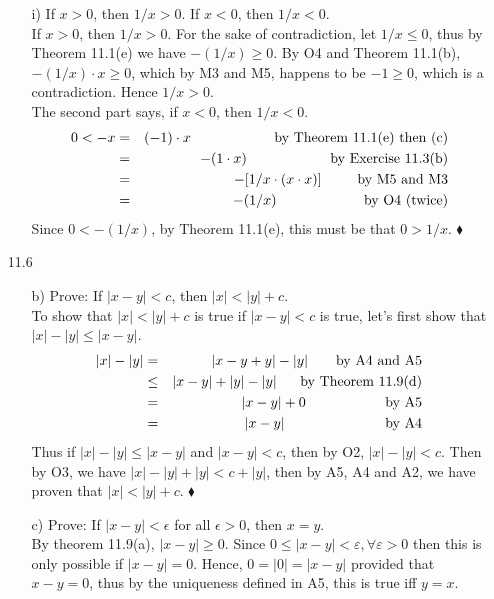 \documentclass[12pt]{article}
\begin{document}
\begin{enumerate}
\begin{enumerate}
\item[i)] If $x > 0$, then $1/x > 0$. If $x < 0$, then $1/x < 0$. \\
If $x > 0$, then $1/x > 0$. For the sake of contradiction, let $1/x \leq 0$, thus by Theorem 11.1(e) we have $-(1/x) \geq 0$. By O4 and Theorem 11.1(b), $-(1/x) \cdot x \geq 0$, which by M3 and M5, happens to be $-1 \geq 0$, which is a contradiction. Hence $1/x > 0$. \[ \]
The second part says, if $x < 0$, then $1/x < 0$. 
\begin{eqnarray*}
0 < -x &=& (-1) \cdot x \hskip 2.1cm \mbox{by Theorem 11.1(e) then (c)} \\
&=& -(1 \cdot x) \hskip 2.1cm \mbox{by Exercise 11.3(b)} \\
&=& -[1/x \cdot (x \cdot x)] \hskip .9cm \mbox{by M5 and M3} \\
&=& -(1/x) \hskip 2.2cm \mbox{by O4 (twice)}
\end{eqnarray*}
Since $0 < -(1/x)$, by Theorem 11.1(e), this must be that $0 > 1/x$. $\blacklozenge$
\end{enumerate}

\item[11.6] 
\begin{enumerate}
\item[b)] Prove: If $|x - y| < c$, then $|x| < |y| + c$. \\
To show that $|x| < |y| + c$ is true if $|x - y| < c$ is true, let's first show that
$|x| - |y| \leq |x - y|$. 
\begin{eqnarray*}
|x| - |y| &=& |x - y + y| - |y| \qquad \mbox{by A4 and A5} \\
&\leq& |x - y| + |y| - |y| \hskip 0.59cm \mbox{by Theorem 11.9(d)} \\
&=& |x - y| + 0 \hskip 2.00cm \mbox{by A5} \\
&=& |x - y| \hskip 2.53cm \mbox{by A4} 
\end{eqnarray*}
Thus if $|x| - |y| \leq |x - y|$ and $|x - y| < c$, then by O2, $|x| - |y| < c$. Then by O3, 
we have $|x| - |y| + |y| < c + |y|$, then by A5, A4 and A2, we have proven that $|x| < |y| + c$.
$\blacklozenge$

\item[c)] Prove: If $|x - y| < \epsilon$ for all $\epsilon > 0$, then $x = y$. \\
By theorem 11.9(a), $|x - y| \geq 0$. Since $0 \leq |x - y| < \varepsilon, \forall \varepsilon > 0$ then this is only possible if $|x - y| = 0$. Hence, $0 = |0| = |x - y|$ provided that 
$x - y = 0$, thus by the uniqueness defined in A5, this is true iff $y = x$.
\end{enumerate}


\end{enumerate}
\end{document}
